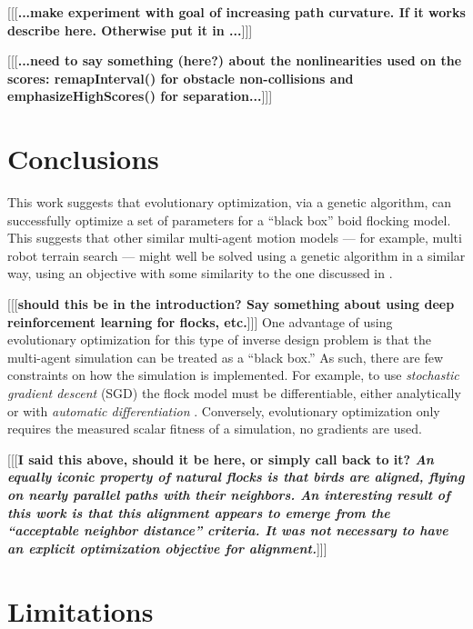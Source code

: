 \documentclass[letterpaper]{article}
\begin{document}
[[[\textbf{...make experiment with goal of increasing path curvature. If it works describe here. Otherwise put it in ...}]]]

[[[\textbf{...need to say something (here?) about the nonlinearities used on the scores: remapInterval() for obstacle non-collisions and emphasizeHighScores() for separation...}]]]

\section{Conclusions}
\label{sec:Conclusions}

This work suggests that evolutionary optimization, via a genetic algorithm, can successfully optimize a set of parameters for a ``black box'' boid flocking model. This suggests that other similar multi-agent motion models --- for example, multi robot terrain search --- might well be solved using a genetic algorithm in a similar way, using an objective with some similarity to the one discussed in .

[[[\textbf{should this be in the introduction? Say something about using deep reinforcement learning for flocks, etc.}]]] One advantage of using evolutionary optimization for this type of inverse design problem is that the multi-agent simulation can be treated as a ``black box.'' As such, there are few constraints on how the simulation is implemented. For example, to use \textit{stochastic gradient descent} (SGD) \citep{robbins_stochastic_1951} the flock model must be differentiable, either analytically or with \textit{automatic differentiation} \citep{baydin_automatic_2018}. Conversely, evolutionary optimization only requires the measured scalar fitness of a simulation, no gradients are used.

[[[\textbf{I said this above, should it be here, or simply call back to it? \textit{An equally iconic property of natural flocks is that birds are aligned, flying on nearly parallel paths with their neighbors. An interesting result of this work is that this alignment appears to \textit{emerge} from the ``acceptable neighbor distance'' criteria. It was \textbf{not} necessary to have an explicit optimization objective for alignment.}}]]]

\section{Limitations}
\label{sec:limitations}
\end{document}
